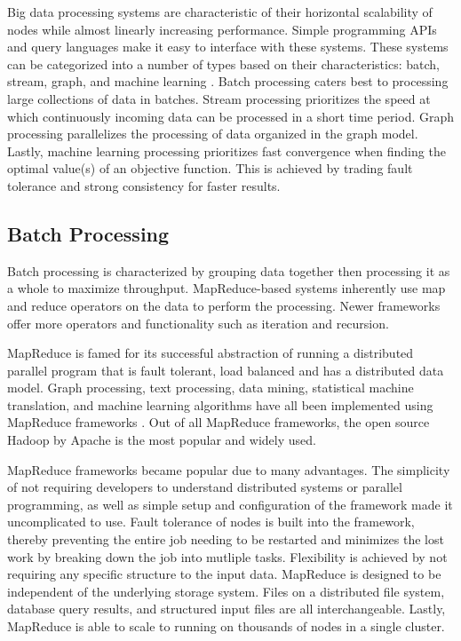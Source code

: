 \documentclass[12pt]{article}
\begin{document}
Big data processing systems are characteristic of their horizontal scalability of nodes while almost linearly increasing performance. Simple programming APIs and query languages make it easy to interface with these systems. These systems can be categorized into a number of types based on their characteristics: batch, stream, graph, and machine learning \cite{zhang2016survey}. Batch processing caters best to processing large collections of data in batches. Stream processing prioritizes the speed at which continuously incoming data can be processed in a short time period. Graph processing parallelizes the processing of data organized in the graph model. Lastly, machine learning processing prioritizes fast convergence when finding the optimal value(s) of an objective function. This is achieved by trading fault tolerance and strong consistency for faster results.




\subsection{Batch Processing} \label{sub:batch}

Batch processing is characterized by grouping data together then processing it as a whole to maximize throughput. MapReduce-based systems inherently use map and reduce operators on the data to perform the processing. Newer frameworks offer more operators and functionality such as iteration and recursion.

MapReduce is famed for its successful abstraction of running a distributed parallel program that is fault tolerant, load balanced and has a distributed data model. Graph processing, text processing, data mining, statistical machine translation, and machine learning algorithms have all been implemented using MapReduce frameworks \cite{dean2008mapreduce}. Out of all MapReduce frameworks, the open source Hadoop by Apache is the most popular and widely used.

MapReduce frameworks became popular due to many advantages. The simplicity of not requiring developers to understand distributed systems or parallel programming, as well as simple setup and configuration of the framework made it uncomplicated to use. Fault tolerance of nodes is built into the framework, thereby preventing the entire job needing to be restarted and minimizes the lost work by breaking down the job into mutliple tasks. Flexibility is achieved by not requiring any specific structure to the input data. MapReduce is designed to be independent of the underlying storage system. Files on a distributed file system, database query results, and structured input files are all interchangeable. Lastly, MapReduce is able to scale to running on thousands of nodes in a single cluster.
\end{document}
